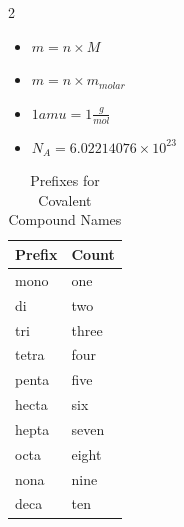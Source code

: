 \documentclass[11pt,addpoints]{exam}   	%
\begin{document}
\begin{multicols}{2}
\begin{itemize}
\item
$m = n \times M$
\vspace{0.2in}

\item
$m = n \times m_{molar}$
\vspace{0.2in}

\item
$1 amu = 1 \frac{g}{mol}$ 
\vspace{0.2in}

\item
$N_A = 6.02214076 \times 10^{23} $ 
\vspace{0.2in}

\end{itemize}
\vspace{0.2in}

\end{multicols}




\pagebreak

\begin{table}
\centering
\begin{tabular}[p]{| l | l |}
\textbf{Prefix} & \textbf{Count} \\
\hline
mono & one \\
di       & two \\
tri       & three \\
tetra       & four \\
penta       & five \\
hecta       & six \\
hepta       & seven \\
octa       & eight \\
nona       & nine \\
deca       & ten \\
\end{tabular}
\caption{Prefixes for Covalent Compound Names}
\label{table:covalent-prefix}
\end{table}
\end{document}
